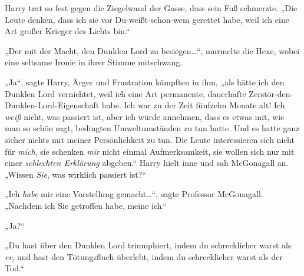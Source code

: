 Harry trat so fest gegen die Ziegelwand der Gasse, dass sein Fuß schmerzte. „Die Leute denken, dass ich sie vor Du-weißt-schon-wem gerettet habe, weil ich eine Art großer Krieger des Lichts bin.“

„Der mit der Macht, den Dunklen Lord zu besiegen…“, murmelte die Hexe, wobei eine seltsame Ironie in ihrer Stimme mitschwang.

„Ja“, sagte Harry, Ärger und Frustration kämpften in ihm, „als hätte ich den Dunklen Lord vernichtet, weil ich eine Art permanente, dauerhafte Zerstör-den-Dunklen-Lord-Eigenschaft habe. Ich war zu der Zeit fünfzehn Monate alt! Ich \emph{weiß} nicht, was passiert ist, aber ich würde annehmen, dass es etwas mit, wie man so schön sagt, bedingten Umweltumständen zu tun hatte. Und es hatte ganz sicher nichts mit meiner Persönlichkeit zu tun. Die Leute interessieren sich nicht für \emph{mich}, sie schenken \emph{mir} nicht einmal Aufmerksamkeit, sie wollen sich nur mit einer \emph{schlechten Erklärung} abgeben.“ Harry hielt inne und sah McGonagall an. „Wissen \emph{Sie}, was wirklich passiert ist?“

„Ich \emph{habe} mir eine Vorstellung gemacht…“, sagte Professor McGonagall. „Nachdem ich Sie getroffen habe, meine ich.“

„Ja?“

„Du hast über den Dunklen Lord triumphiert, indem du schrecklicher warst als \emph{er}, und hast den Tötungsfluch überlebt, indem du schrecklicher warst als der Tod.“

